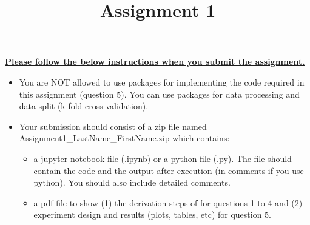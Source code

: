 \documentclass{exam}
\title{Assignment 1}
\date{}
\begin{document}
\maketitle
\thispagestyle{headandfoot}

\begin{center}
  {}
\end{center}
\vspace{.5cm}

\underline{\bf Please follow the below instructions when you submit the assignment.}
\begin{itemize}
\item You are NOT allowed to use packages for implementing the code required in this assignment (question 5). You can use packages for data processing and data split (k-fold cross validation).
\item Your submission should consist of a zip file named Assignment1\_LastName\_FirstName.zip which contains: 
\begin{itemize}
\item a jupyter notebook file (.ipynb) or a python file (.py). The file should contain the code and
the output after execution (in comments if you use python). You should also include detailed comments.
\item  a pdf file to show (1) the derivation steps of for questions 1 to 4 and (2)  experiment design and results (plots, tables, etc) for question 5.
\end{itemize}
\end{itemize}
\end{document}
